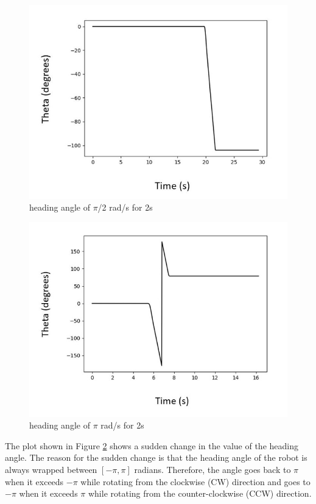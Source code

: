 \documentclass[journal]{IEEEtran}
\begin{document}
\begin{figure} [h]
\begin{center}
\includegraphics[width=0.77\linewidth]{image_1/figure_1_5_2_2.jpg}
\end{center}
   \caption{heading angle of $\pi$/2 rad/s for 2s}
   \label{figure_1_5_2_2}
\end{figure}

\begin{figure} [h]
\begin{center}
\includegraphics[width=0.77\linewidth]{image_1/figure_1_5_2_3.jpg}
\end{center}
   \caption{heading angle of $\pi$ rad/s for 2s}
   \label{figure_1_5_2_3}
\end{figure}

\newpage
The plot shown in Figure \ref{figure_1_5_2_3} shows a sudden change in the value of the heading angle. The reason for the sudden change is that the heading angle of the robot is always wrapped between $[-\pi, \pi]$ radians. Therefore, the angle goes back to $\pi$ when it exceeds $-\pi$ while rotating from the clockwise (CW) direction and goes to $-\pi$ when it exceeds $\pi$ while rotating from the counter-clockwise (CCW) direction.\\
\end{document}
